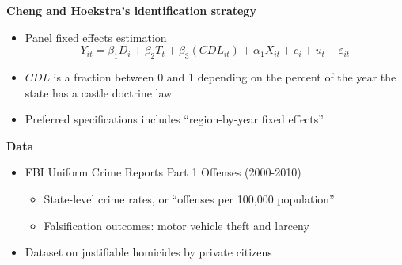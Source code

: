 \documentclass[notes=show]{beamer}
\begin{document}
\begin{frame}[plain]
	\begin{center}
	\textbf{Cheng and Hoekstra's identification strategy}
	\end{center}
	
	\begin{itemize}
	\item Panel fixed effects estimation$$Y_{it} = \beta_1 D_i + \beta_2 T_t + \beta_3 (CDL_{it}) + \alpha_1X_{it} + c_i + u_t + \varepsilon_{it}$$
	\item $CDL$ is a fraction between 0 and 1 depending on the percent of the year the state has a castle doctrine law 
	\item Preferred specifications includes ``region-by-year fixed effects'' 
	\end{itemize}
\end{frame}


\begin{frame}[plain]
	\begin{center}
	\textbf{Data}
	\end{center}
	
	\begin{itemize}
	\item FBI Uniform Crime Reports Part 1 Offenses (2000-2010)
		\begin{itemize}
		\item State-level crime rates, or ``offenses per 100,000 population''
		\item Falsification outcomes: motor vehicle theft and larceny
		\end{itemize}
	\item Dataset on justifiable homicides by private citizens
	\end{itemize}
\end{frame}
\end{document}

